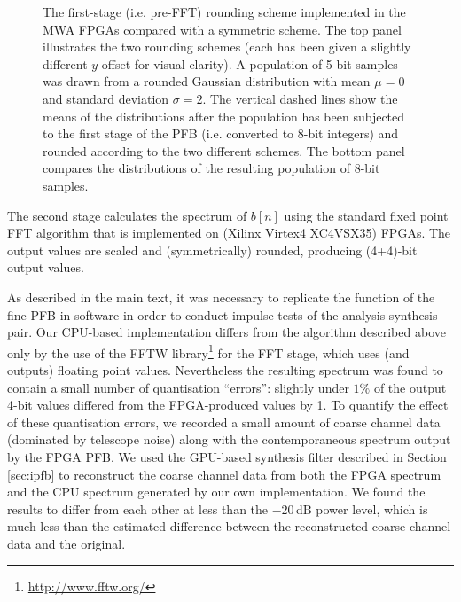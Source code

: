 \documentclass{pasa}%
\begin{document}
\begin{appendix}
\begin{figure}[t!]
    \caption{The first-stage (i.e. pre-FFT) rounding scheme implemented in the MWA FPGAs compared with a symmetric scheme. The top panel illustrates the two rounding schemes (each has been given a slightly different $y$-offset for visual clarity). A population of 5-bit samples was drawn from a rounded Gaussian distribution with mean $\mu = 0$ and standard deviation $\sigma = 2$. The vertical dashed lines show the means of the distributions after the population has been subjected to the first stage of the PFB (i.e. converted to 8-bit integers) and rounded according to the two different schemes. The bottom panel compares the distributions of the resulting population of 8-bit samples.}
    \label{fig:pre_fft_distributions}
\end{figure}

The second stage calculates the spectrum of $b[n]$ using the standard fixed point FFT algorithm that is implemented on (Xilinx Virtex4 XC4VSX35) FPGAs.
The output values are scaled and (symmetrically) rounded, producing (4+4)-bit output values.

As described in the main text, it was necessary to replicate the function of the fine PFB in software in order to conduct impulse tests of the analysis-synthesis pair.
Our CPU-based implementation differs from the algorithm described above only by the use of the FFTW library\footnote{\url{http://www.fftw.org/}} for the FFT stage, which uses (and outputs) floating point values.
Nevertheless the resulting spectrum was found to contain a small number of quantisation ``errors'': slightly under $1\%$ of the output 4-bit values differed from the FPGA-produced values by 1.
To quantify the effect of these quantisation errors, we recorded a small amount of coarse channel data (dominated by telescope noise) along with the contemporaneous spectrum output by the FPGA PFB.
We used the GPU-based synthesis filter described in Section \ref{sec:ipfb} to reconstruct the coarse channel data from both the FPGA spectrum and the CPU spectrum generated by our own implementation.
We found the results to differ from each other at less than the $-20\,$dB power level, which is much less than the estimated difference between the reconstructed coarse channel data and the original.

\end{appendix}



\end{document}
